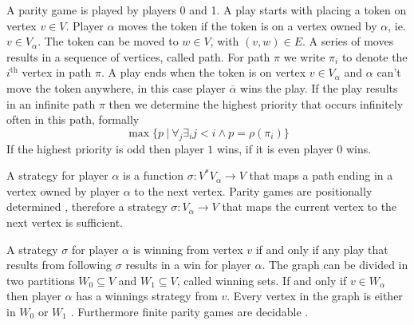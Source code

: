 \documentclass[]{article}
\begin{document}
A parity game is played by players 0 and 1. A play starts with placing a token on vertex $v \in V$. Player $\alpha$ moves the token if the token is on a vertex owned by $\alpha$, ie. $v \in V_\alpha$. The token can be moved to $w \in V$, with $(v,w) \in E$. A series of moves results in a sequence of vertices, called path. For path $\pi$ we write $\pi_i$ to denote the $i^{\text{th}}$ vertex in path $\pi$. A play ends when the token is on vertex $v \in V_\alpha$ and $\alpha$ can't move the token anywhere, in this case player $\overline{\alpha}$ wins the play. If the play results in an infinite path $\pi$ then we determine the highest priority that occurs infinitely often in this path, formally
\[ \max\{ p \ |\ \forall_j \exists_i j < i \wedge p = \rho(\pi_i) \}\] 
If the highest priority is odd then player $1$ wins, if it is even player $0$ wins.

A strategy for player $\alpha$ is a function $\sigma : V^*V_\alpha \rightarrow V$ that maps a path ending in a vertex owned by player $\alpha$ to the next vertex. Parity games are positionally determined \cite{Bradfield2018}, therefore a strategy $\sigma: V_\alpha \rightarrow V$ that maps the current vertex to the next vertex is sufficient. 

A strategy $\sigma$ for player $\alpha$ is winning from vertex $v$ if and only if any play that results from following $\sigma$ results in a win for player $\alpha$. The graph can be divided in two partitions $W_0 \subseteq V$ and $W_1 \subseteq V$, called winning sets. If and only if $v \in W_\alpha$ then player $\alpha$ has a winnings strategy from $v$. Every vertex in the graph is either in $W_0$ or $W_1$ \cite{Bradfield2018}. Furthermore finite parity games are decidable \cite{Bradfield2018}.
\end{document}
